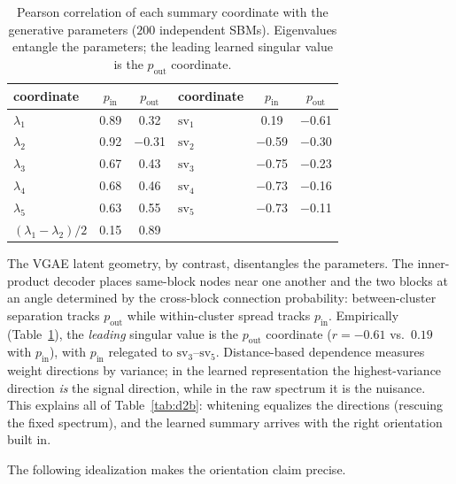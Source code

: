 \documentclass[11pt]{article}
\begin{document}
\begin{table}[ht]
\centering
\caption{Pearson correlation of each summary coordinate with the generative
parameters ($200$ independent SBMs). Eigenvalues entangle the parameters; the
leading learned singular value is the $p_{\mathrm{out}}$ coordinate.}
\label{tab:mech}
\begin{tabular}{lcc@{\qquad}lcc}
\toprule
coordinate & $p_{\mathrm{in}}$ & $p_{\mathrm{out}}$ & coordinate & $p_{\mathrm{in}}$ & $p_{\mathrm{out}}$ \\
\midrule
$\lambda_1$ & 0.89 & 0.32  & $\mathrm{sv}_1$ & 0.19 & $-$0.61 \\
$\lambda_2$ & 0.92 & $-$0.31 & $\mathrm{sv}_2$ & $-$0.59 & $-$0.30 \\
$\lambda_3$ & 0.67 & 0.43  & $\mathrm{sv}_3$ & $-$0.75 & $-$0.23 \\
$\lambda_4$ & 0.68 & 0.46  & $\mathrm{sv}_4$ & $-$0.73 & $-$0.16 \\
$\lambda_5$ & 0.63 & 0.55  & $\mathrm{sv}_5$ & $-$0.73 & $-$0.11 \\
\midrule
$(\lambda_1{-}\lambda_2)/2$ & 0.15 & 0.89 & & & \\
\bottomrule
\end{tabular}
\end{table}

The VGAE latent geometry, by contrast, disentangles the parameters. The
inner-product decoder places same-block nodes near one another and the two
blocks at an angle determined by the cross-block connection probability:
between-cluster separation tracks $p_{\mathrm{out}}$ while within-cluster
spread tracks $p_{\mathrm{in}}$. Empirically (Table~\ref{tab:mech}), the
\emph{leading} singular value is the $p_{\mathrm{out}}$ coordinate ($r =
-0.61$ vs.\ $0.19$ with $p_{\mathrm{in}}$), with $p_{\mathrm{in}}$ relegated
to $\mathrm{sv}_3$--$\mathrm{sv}_5$. Distance-based dependence measures weight
directions by variance; in the learned representation the highest-variance
direction \emph{is} the signal direction, while in the raw spectrum it is the
nuisance. This explains all of Table~\ref{tab:d2b}: whitening equalizes the
directions (rescuing the fixed spectrum), and the learned summary arrives with
the right orientation built in.

The following idealization makes the orientation claim precise.
\end{document}
